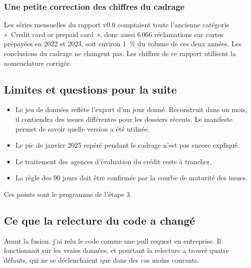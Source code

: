 \documentclass[11pt,a4paper]{article}
\begin{document}
\subsubsection*{Une petite correction des chiffres du cadrage}
Les séries mensuelles du rapport v0.0 comptaient toute l'ancienne catégorie «~Credit card or prepaid card~», donc aussi 6\,066 réclamations sur cartes prépayées en 2022 et 2023, soit environ 1~\% du volume de ces deux années. Les conclusions du cadrage ne changent pas. Les chiffres de ce rapport utilisent la nomenclature corrigée.

\subsection{Limites et questions pour la suite}

\begin{itemize}
  \item Le jeu de données reflète l'export d'un jour donné. Reconstruit dans un mois, il contiendra des issues différentes pour les dossiers récents. Le manifeste permet de savoir quelle version a été utilisée.
  \item Le pic de janvier 2025 repéré pendant le cadrage n'est pas encore expliqué.
  \item Le traitement des agences d'évaluation du crédit reste à trancher.
  \item La règle des 90 jours doit être confirmée par la courbe de maturité des issues.
\end{itemize}

Ces points sont le programme de l'étape 3.

\subsection{Ce que la relecture du code a changé}

Avant la fusion, j'ai relu le code comme une pull request en entreprise. Il fonctionnait sur les vraies données, et pourtant la relecture a trouvé quatre défauts, qui ne se déclenchaient que dans des cas moins courants.
\end{document}
